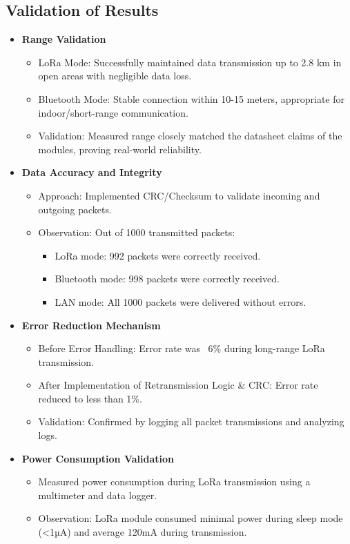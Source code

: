 \documentclass[12pt]{report}
\begin{document}
\subsection{Validation of Results}
\begin{itemize}
    \item \textbf{Range Validation}
    \begin{itemize}
        \item LoRa Mode: Successfully maintained data transmission up to 2.8 km in open areas with negligible data loss.
        \item Bluetooth Mode: Stable connection within 10-15 meters, appropriate for indoor/short-range communication.
        \item Validation: Measured range closely matched the datasheet claims of the modules, proving real-world reliability.
    \end{itemize}
    
    \item \textbf{Data Accuracy and Integrity}
    \begin{itemize}
        \item Approach: Implemented CRC/Checksum to validate incoming and outgoing packets.
        \item Observation: Out of 1000 transmitted packets:
        \begin{itemize}
            \item LoRa mode: 992 packets were correctly received.
            \item Bluetooth mode: 998 packets were correctly received.
            \item LAN mode: All 1000 packets were delivered without errors.
        \end{itemize}
    \end{itemize}
    
    \item \textbf{Error Reduction Mechanism}
    \begin{itemize}
        \item Before Error Handling: Error rate was ~6\% during long-range LoRa transmission.
        \item After Implementation of Retransmission Logic \& CRC: Error rate reduced to less than 1\%.
        \item Validation: Confirmed by logging all packet transmissions and analyzing logs.
    \end{itemize}
    
    \item \textbf{Power Consumption Validation}
    \begin{itemize}
        \item Measured power consumption during LoRa transmission using a multimeter and data logger.
        \item Observation: LoRa module consumed minimal power during sleep mode (<1µA) and average 120mA during transmission.
    \end{itemize}
\end{itemize}
\end{document}
